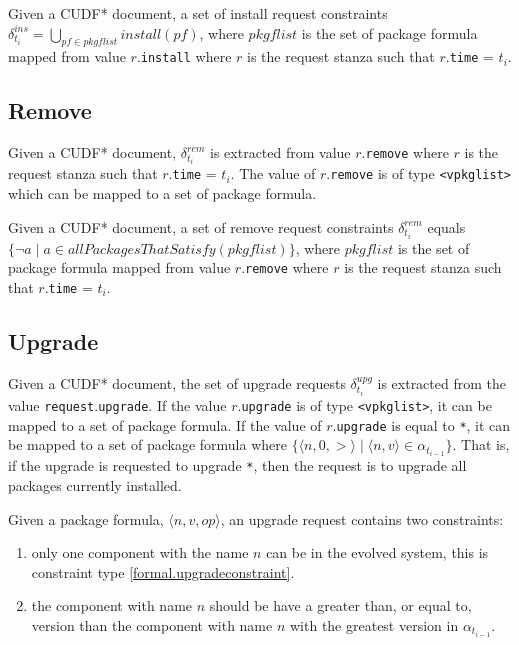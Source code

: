 \begin{defs}
Given a CUDF* document, a set of install request constraints $\delta_{t_i}^{ins} = \bigcup \limits_{pf \in pkgflist} install(pf)$, 
where $pkgflist$ is the set of package formula mapped from value $r$.\texttt{install} where $r$ is the request stanza such that $r$.\texttt{time} = $t_i$.
\end{defs}

\subsection{Remove}
Given a CUDF* document, $\delta_{t_i}^{rem}$ is extracted from value $r$.\texttt{remove} where $r$ is the request stanza such that $r$.\texttt{time} = $t_i$.
The value of $r$.\texttt{remove} is of type \texttt{<vpkglist>} which can be mapped to a set of package formula.
\begin{defs}
Given a CUDF* document, a set of remove request constraints $\delta_{t_i}^{rem}$ equals $\{ \neg a \mid a \in allPackagesThatSatisfy(pkgflist)\}$, 
where $pkgflist$ is the set of package formula mapped from value $r$.\texttt{remove} where $r$ is the request stanza such that $r$.\texttt{time} = $t_i$.
\end{defs}

\subsection{Upgrade}
Given a CUDF* document, the set of upgrade requests $\delta_{t_i}^{upg}$ is extracted from the value \texttt{request}.\texttt{upgrade}.
If the value $r$.\texttt{upgrade} is of type \texttt{<vpkglist>}, it can be mapped to a set of package formula.
If the value of $r$.\texttt{upgrade} is equal to \texttt{*}, it can be mapped to a set of package formula where $\{\langle n, 0, > \rangle \mid \langle n,v \rangle \in \alpha_{t_{i-1}} \}$.
That is, if the upgrade is requested to upgrade \texttt{*}, then the request is to upgrade all packages currently installed.

Given a package formula, $\langle n, v, op \rangle$, an upgrade request contains two constraints:
\begin{enumerate}
  \item only one component with the name $n$ can be in the evolved system, this is constraint type \ref{formal.upgradeconstraint}.
  \item the component with name $n$ should be have a greater than, or equal to, version than the component with name $n$ with the greatest version in $\alpha_{t_{i-1}}$.
\end{enumerate}

